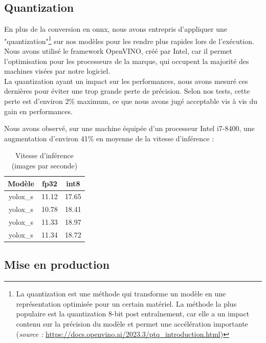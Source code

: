 \subsection{Quantization}

En plus de la conversion en onnx, nous avons entrepris d'appliquer une 
"quantization"\footnote{La quantization est une méthode qui transforme un modèle en une représentation 
optimisée pour un certain matériel. La méthode la plus populaire est la quantization
8-bit post entraînement, car elle a un impact contenu sur la précision du modèle 
et permet une accélération importante (\textit{source : }
\url{https://docs.openvino.ai/2023.3/ptq_introduction.html})}
sur nos modèles pour les rendre plus rapides lors de l'exécution.\\

Nous avons utilisé le framework OpenVINO, créé par Intel, car il permet l'optimisation pour 
les processeurs de la marque, qui occupent la majorité des machines visées par notre logiciel.\\ 

La quantization ayant un impact sur les performances, nous avons mesuré ces dernières pour 
éviter une trop grande perte de précision. Selon nos tests, cette perte est d'environ 2\% maximum, 
ce que nous avons jugé acceptable vis à vis du gain en performances. 

Nous avons observé, sur une machine équipée d'un processeur Intel i7-8400, une augmentation d'environ
41\% en moyenne de la vitesse d'inférence : \\

\begin{table}[!h]
    \caption{Vitesse d'inférence (images par seconde)}
    \begin{center}
    \begin{tabular}{c c c}
        \hline
        Modèle & fp32 & int8 \\ \hline
        yolox\_s & 11.12 & 17.65 \\
        yolox\_s & 10.78 & 18.41 \\
        yolox\_s & 11.33 & 18.97 \\
        yolox\_s & 11.34 & 18.72 \\ \hline
    \end{tabular}
\end{center}
\end{table}

\pagebreak

\subsection{Mise en production}

